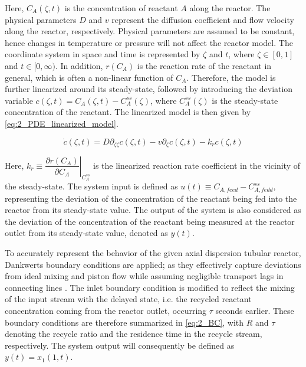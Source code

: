 Here, $C_A(\zeta, t)$ is the concentration of reactant $A$ along the reactor. The physical parameters $D$ and $v$ represent the diffusion coefficient and flow velocity along the reactor, respectively. Physical parameters are assumed to be constant, hence changes in temperature or pressure will not affect the reactor model. The coordinate system in space and time is represented by $\zeta$ and $t$, where $\zeta \in [0, 1]$ and $t \in [0, \infty)$. In addition, $r(C_A)$ is the reaction rate of the reactant in general, which is often a non-linear function of $C_A$. Therefore, the model is further linearized around its steady-state, followed by introducing the deviation variable $c(\zeta, t) = C_A(\zeta, t) - C_{A}^{ss}(\zeta)$, where $C_{A}^{ss}(\zeta)$ is the steady-state concentration of the reactant. The linearized model is then given by \eqref{eq:2_PDE_linearized_model}.

\begin{equation} \label{eq:2_PDE_linearized_model}
    \dot{c}(\zeta, t) = D \partial_{\zeta \zeta} c(\zeta, t) - v \partial_\zeta c(\zeta, t) - k_r c(\zeta, t)
\end{equation}

Here, $k_r \equiv \left. \dfrac{\partial r(C_A)}{\partial C_A} \right|_{C_{A}^{ss}}$ is the linearized reaction rate coefficient in the vicinity of the steady-state. The system input is defined as $u(t) \equiv C_{A, feed} - C_{A, fedd}^{ss}$, representing the deviation of the concentration of the reactant being fed into the reactor from its steady-state value. The output of the system is also considered as the deviation of the concentration of the reactant being measured at the reactor outlet from its steady-state value, denoted as $y(t)$. 

To accurately represent the behavior of the given axial dispersion tubular reactor, Dankwerts boundary conditions are applied; as they effectively capture deviations from ideal mixing and piston flow while assuming negligible transport lags in connecting lines \cite{Danckwerts1953Continuous}.
The inlet boundary condition is modified to reflect the mixing of the input stream with the delayed state, i.e. the recycled reactant concentration coming from the reactor outlet, occurring $\tau$ seconds earlier.
These boundary conditions are therefore summarized in \eqref{eq:2_BC}, with $R$ and $\tau$ denoting the recycle ratio and the residence time in the recycle stream, respectively. The system output will consequently be defined as $y(t) = x_1(1, t)$. 

